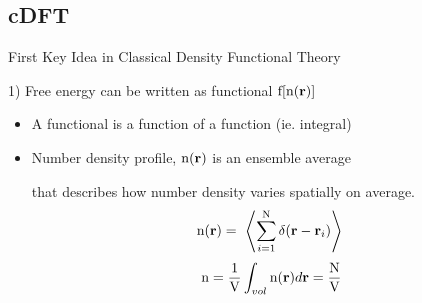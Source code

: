 \documentclass{beamer}
\renewcommand{\vec}[1]{\mathbf{#1}}
\begin{document}
\subsection*{cDFT}
\begin{frame}{First Key Idea in Classical Density Functional Theory}
    \begin{block}{1) Free energy can be written as functional $\text f[\text{n}(\vec r)]$}  
       \begin{itemize}
          \item A functional is a function of a function (ie. integral)
          \item Number density profile, $\text n(\vec{r})$ is an ensemble average
          
           that describes how number density varies spatially on average. 
          \begin{displaymath}\text n(\vec r)=~\left<\sum_{i=1}^{\text N}\delta(\vec r - \vec r_i)\right>~\end{displaymath} 
          \begin{displaymath} \text n=\frac{1}{\text V}\int_{vol}{\text n(\vec{r})}{d\vec{r}}=\frac{\text N}{\text V}\end{displaymath}
        \end{itemize}
    \end{block}
\end{frame}  
  
\end{document}
